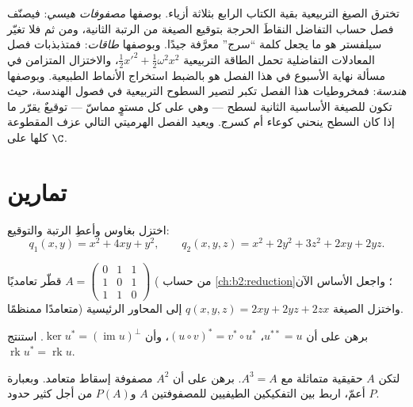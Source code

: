 \begin{remark}
تخترق الصيغ التربيعية بقية الكتاب الرابع بثلاثة
أزياء. بوصفها \emph{مصفوفات هيسي}: فيصنّف فصل حساب
التفاضل النقاطَ الحرجة بتوقيع الصيغة من
الرتبة الثانية، ومن ثم فلا تغيّر سيلفستر هو ما يجعل
كلمة ``سرج'' معرَّفة جيدًا. وبوصفها \emph{طاقات}: فمتذبذبات
فصل المعادلات التفاضلية تحمل الطاقة
التربيعية $\frac12x'^2 + \frac12\omega^2x^2$، والاختزال المتزامن
في مسألة نهاية الأسبوع في هذا الفصل هو
بالضبط استخراج الأنماط الطبيعية. وبوصفها \emph{هندسة}:
فمخروطيات هذا الفصل تكبر لتصير السطوح التربيعية في
فصول الهندسة، حيث تكون للصيغة الأساسية الثانية
لسطح --- وهي  على كل مستوٍ مماسّ ---
توقيعٌ يقرّر ما إذا كان السطح ينحني كوعاء أم
كسرج. ويعيد الفصل الهرميتي التالي عزف المقطوعة كلها
على $\C$.
\end{remark}

\section{تمارين}

\begin{exercise}[$\star$]\label{exo:b2:quadratic:1}
اختزل بغاوس وأعطِ الرتبة والتوقيع:
\[
q_1(x,y) = x^2 + 4xy + y^2,
\qquad
q_2(x,y,z) = x^2 + 2y^2 + 3z^2 + 2xy + 2yz .
\]
\end{exercise}

\begin{exercise}[$\star$]\label{exo:b2:quadratic:2}
قطّر تعامديًا $A = \begin{pmatrix} 0 & 1 & 1\\ 1 & 0 &
1\\ 1 & 1 & 0\end{pmatrix}$ ( من
حساب \cref{ch:b2:reduction}؛ واجعل الأساس الآن
متعامدًا ممنظمًا) واختزل الصيغة $q(x,y,z) = 2xy + 2yz + 2zx$ إلى
المحاور الرئيسية.
\end{exercise}

\begin{exercise}[$\star$]\label{exo:b2:quadratic:3}
برهن على أن $u^{**} = u$، $(u \circ v)^* = v^* \circ u^*$، وأن
$\ker u^* = (\operatorname{im} u)^{\perp}$. استنتج
$\operatorname{rk} u^* = \operatorname{rk} u$.
\end{exercise}

\begin{exercise}[$\star\star$]\label{exo:b2:quadratic:4}
لتكن $A$ حقيقية متماثلة مع $A^3 = A$. برهن على أن $A^2$
مصفوفة إسقاط متعامد. وبعبارة أعمّ، اربط بين
التفكيكين الطيفيين للمصفوفتين $A$ و$P(A)$ من أجل كثير حدود $P$.
\end{exercise}

